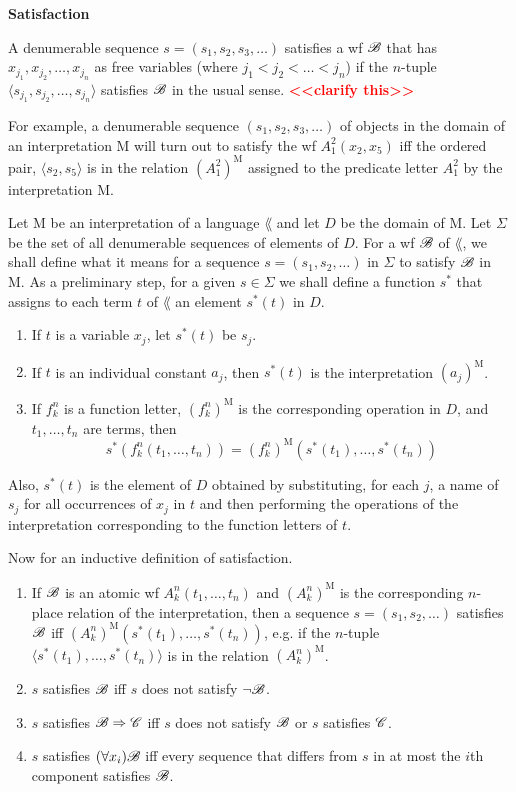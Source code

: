 \textbf{Satisfaction}

A denumerable sequence $s=(s_1,s_2,s_3,\dots)$ satisfies a wf $\mathscr{B}$ that has $x_{j_1}, x_{j_2}, \dots, x_{j_n}$ as free variables (where $j_1<j_2<\dots <j_n$) if the $n$-tuple $\langle s_{j_1}, s_{j_2}, \dots, s_{j_n} \rangle$ satisfies $\mathscr{B}$ in the usual sense. \textcolor{red}{\textbf{<<clarify this>>}}

For example, a denumerable sequence $(s_1,s_2,s_3,\dots)$ of objects in the domain of an interpretation M will turn out to satisfy the wf $A_1^2(x_2, x_5)$ iff the ordered pair, $\langle s_2,s_5 \rangle$ is in the relation $(A_1^2)^{\text{M}}$ assigned to the predicate letter $A_1^2$ by the interpretation M.

Let M be an interpretation of a language $\lang$ and let $D$ be the domain of M. Let $\Sigma$ be the set of all denumerable sequences of elements of $D$. For a wf $\mathscr{B}$ of $\lang$, we shall define what it means for a sequence $s=(s_1,s_2, \dots)$ in $\Sigma$ to satisfy $\mathscr{B}$ in M. As a preliminary step, for a given $s \in \Sigma$ we shall define a function $s^*$ that assigns to each term $t$ of $\lang$ an element $s^*(t)$ in $D$.

\begin{enumerate}
    \item If $t$ is a variable $x_j$, let $s^*(t)$ be $s_j$.
    \item If $t$ is an individual constant $a_j$, then $s^*(t)$ is the interpretation $(a_j)^{\text{M}}$.
    \item If $f_k^n$ is a function letter, $(f_k^n)^{\text{M}}$ is the corresponding operation in $D$, and $t_1,\dots, t_n$ are terms, then 
    \[s^*(f_k^n(t_1,\dots, t_n))=(f_k^n)^\text{M} (s^*(t_1),\dots, s^*(t_n))\]
\end{enumerate}

Also, $s^*(t)$ is the element of $D$ obtained by substituting, for each $j$, a name of $s_j$ for all occurrences of $x_j$ in $t$ and then performing the operations of the interpretation corresponding to the function letters of $t$.

Now for an inductive definition of satisfaction.

\begin{enumerate}
    \item If $\mathscr{B}$ is an atomic wf $A_k^n(t_1, \dots, t_n)$ and $(A_k^n)^\text{M}$ is the corresponding $n$-place relation of the interpretation, then a sequence $s=(s_1,s_2,\dots)$ satisfies $\mathscr{B}$ iff $(A_k^n)^\text{M}(s^*(t_1),\dots, s^*(t_n))$, e.g. if the $n$-tuple $\langle s^*(t_1),\dots, s^*(t_n) \rangle$ is in the relation $(A_k^n)^\text{M}$.
    \item $s$ satisfies $\mathscr{B}$ iff $s$ does not satisfy $\lnot \mathscr{B}$.
    \item $s$ satisfies $\mathscr{B} \Rightarrow \mathscr{C}$ iff $s$ does not satisfy $\mathscr{B}$ or $s$ satisfies $\mathscr{C}$. 
    \item $s$ satisfies $(\forall x_i)\mathscr{B}$ iff every sequence that differs from $s$ in at most the $i$th component satisfies $\mathscr{B}$.
\end{enumerate}

